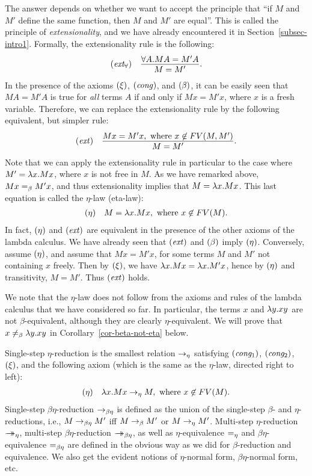 \documentclass{article}
\begin{document}
The answer depends on whether we want to accept the principle that
``if $M$ and $M'$ define the same function, then $M$ and $M'$ are
equal''. This is called the principle of {\em extensionality}, and we
have already encountered it in Section~\ref{subsec-intro1}. Formally, the
extensionality rule is the following:
\[ \begin{array}{lc}
  \trule{ext$_\forall$} & \deriv{\forall A.MA=M'A}{M=M'}.
\end{array}
\]
In the presence of the axioms $\textrm{(\textit{$\xi$\/})}$, $\textrm{(\textit{cong\/})}$, and
$\textrm{(\textit{$\beta$\/})}$, it can be easily seen that $MA=M'A$ is true for {\em
  all} terms $A$ if and only if $Mx=M'x$, where $x$ is a fresh
variable. Therefore, we can replace the extensionality rule by the
following equivalent, but simpler rule:
\[ \begin{array}{lc}
  \trule{ext} & \deriv{Mx=M'x, \mbox{ where $x\not\in\FV{M,M'}$}}{M=M'}.
\end{array}
\]
Note that we can apply the extensionality rule in particular to the
case where $M'=\lambda x.Mx$, where $x$ is not free in $M$. As we have
remarked above, $Mx=_{\beta} M'x$, and thus extensionality implies that
$M=\lambda x.Mx$. This last equation is called the $\eta$-law (eta-law):
\[ \begin{array}{lc}
  \textrm{(\textit{$\eta$\/})} & M=\lambda x.Mx, \mbox{ where $x\not\in FV(M)$}.
\end{array}
\]
In fact, $\textrm{(\textit{$\eta$\/})}$ and $\textrm{(\textit{ext\/})}$ are equivalent in the
presence of the other axioms of the lambda calculus. We have already
seen that $\textrm{(\textit{ext\/})}$ and $\textrm{(\textit{$\beta$\/})}$ imply $\textrm{(\textit{$\eta$\/})}$.
Conversely, assume $\textrm{(\textit{$\eta$\/})}$, and assume that $Mx=M'x$, for some
terms $M$ and $M'$ not containing $x$ freely.  Then by $\textrm{(\textit{$\xi$\/})}$,
we have $\lambda x.Mx=\lambda x.M'x$, hence by $\textrm{(\textit{$\eta$\/})}$ and
transitivity, $M=M'$. Thus $\textrm{(\textit{ext\/})}$ holds.

We note that the $\eta$-law does not follow from the axioms and rules
of the lambda calculus that we have considered so far. In particular,
the terms $x$ and $\lambda y.xy$ are not $\beta$-equivalent, although
they are clearly $\eta$-equivalent. We will prove that $x\not=_{\beta} \lambda
y.xy$ in Corollary~\ref{cor-beta-not-eta} below.

Single-step $\eta$-reduction is the smallest relation $\rightarrow_{\eta}$
satisfying $\textrm{(\textit{cong$_1$\/})}$, $\textrm{(\textit{cong$_2$\/})}$, $\textrm{(\textit{$\xi$\/})}$, and
the following axiom (which is the same as the $\eta$-law, directed
right to left):
\[ \begin{array}{lc}\label{page-def-eta}
  \textrm{(\textit{$\eta$\/})} & \lambda x.Mx\rightarrow_{\eta} M, \mbox{ where $x\not\in FV(M)$}.
\end{array}
\]
Single-step $\beta\eta$-reduction $\rightarrow_{\beta\eta}$ is defined as the union of
the single-step $\beta$- and $\eta$-reductions, i.e., $M\rightarrow_{\beta\eta} M'$ iff
$M\rightarrow_{\beta} M'$ or $M\rightarrow_{\eta} M'$. Multi-step $\eta$-reduction $\mathrel{\rightarrow\!\!\!\!\!\rightarrow}_{\eta}$,
multi-step $\beta\eta$-reduction $\mathrel{\rightarrow\!\!\!\!\!\rightarrow}_{\beta\eta}$, as well as
$\eta$-equivalence $=_{\eta}$ and $\beta\eta$-equivalence $=_{\beta\eta}$ are
defined in the obvious way as we did for $\beta$-reduction and
equivalence. We also get the evident notions of $\eta$-normal form,
$\beta\eta$-normal form, etc.
\end{document}
